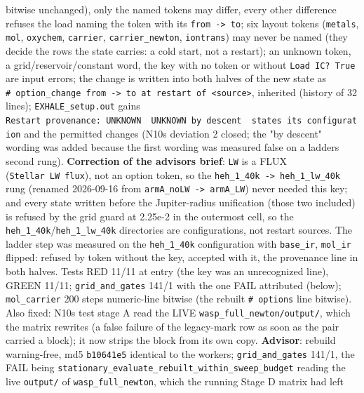 \documentclass[english,a4paper]{my_memo}
\begin{document}
\begin{itemize}
  bitwise unchanged), only the named tokens may differ, every other
  difference refuses the load naming the token with its \texttt{from\ -\textgreater{}\ to}; six
  layout tokens (\texttt{metals}, \texttt{mol}, \texttt{oxychem}, \texttt{carrier}, \texttt{carrier\_newton},
  \texttt{iontrans}) may never be named (they decide the rows the state carries: a
  cold start, not a restart); an unknown token, a grid/reservoir/constant
  word, the key with no token or without \texttt{Load\ IC?\ True} are input errors;
  the change is written into both halves of the new state as
  \texttt{\#\ option\_change\ from\ -\textgreater{}\ to\ at\ restart\ of\ \textless{}source\textgreater{}}, inherited (history of
  32 lines); \texttt{EXHALE\_setup.out} gains \texttt{Restart\ provenance:\ UNKNOWN\ \textbar{}\ UNKNOWN\ by\ descent\ \textbar{}\ states\ its\ configuration} and the permitted changes (N10\textquotesingle s
  deviation 2 closed; the "by descent" wording was added because the first
  wording was measured false on a ladder\textquotesingle s second rung). \textbf{Correction of
  the advisor\textquotesingle s brief}: \texttt{LW} is a FLUX (\texttt{Stellar\ LW\ flux}), not an option
  token, so the \texttt{heh\_1\_40k\ -\textgreater{}\ heh\_1\_lw\_40k} rung (renamed 2026-09-16 from \texttt{armA\_noLW\ -\textgreater{}\ armA\_LW}) never needed this key; and every
  state written before the Jupiter-radius unification (those two included)
  is refused by the grid guard at 2.25e-2 in the outermost cell, so the \texttt{heh\_1\_40k}/\texttt{heh\_1\_lw\_40k}
  directories are configurations, not restart sources. The ladder step was
  measured on the \texttt{heh\_1\_40k} configuration with \texttt{base\_ir}, \texttt{mol\_ir} flipped:
  refused by token without the key, accepted with it, the provenance line
  in both halves. Tests RED 11/11 at entry (the key was an unrecognized
  line), GREEN 11/11; \texttt{grid\_and\_gates} 141/1 with the one FAIL attributed
  (below); \texttt{mol\_carrier} 200 steps numeric-line bitwise (the rebuilt
  \texttt{\#\ options} line bitwise). Also fixed: N10\textquotesingle s test stage A read the LIVE
  \texttt{wasp\_full\_newton/output/}, which the matrix rewrites (a false failure of
  the legacy-mark row as soon as the pair carried a block); it now strips
  the block from its own copy. \textbf{Advisor}: rebuild warning-free, md5
  \texttt{b10641e5} identical to the worker\textquotesingle s; \texttt{grid\_and\_gates} 141/1, the FAIL
  being \texttt{stationary\_evaluate\_rebuilt\_within\_sweep\_budget} reading the live
  \texttt{output/} of \texttt{wasp\_full\_newton}, which the running Stage D matrix had left

\end{itemize}
\end{document}
